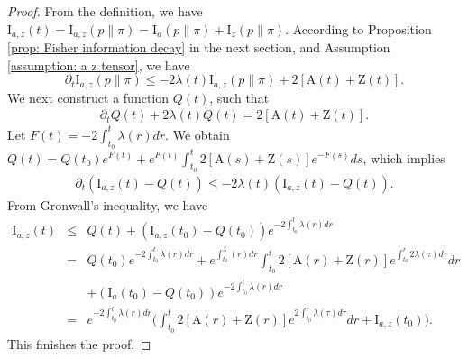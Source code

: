 \documentclass[11pt,reqno]{amsart}
\newcommand{\beaa}{\begin{eqnarray*}}
\newcommand{\eeaa}{\end{eqnarray*}}
\def\pa{\partial}
\def\qed{ \hfill \vrule width.25cm height.25cm depth0cm\smallskip}
\begin{document}
\begin{proof}
From the definition, we have $\mathrm I_{a,z}(t)=\mathrm I_{a,z}({p} \|\pi)=\mathrm I_{a}({p} \|\pi)+\mathrm I_{z}({p} \|\pi)$.	According to Proposition \ref{prop: Fisher information decay} in the next section, and Assumption \eqref{assumption: a z tensor}, we have 
\begin{equation*}
    \pa_t\mathrm I_{a,z}({p} \|\pi)\leq -2\lambda(t) \mathrm{I}_{a,z}({p} \|\pi)+2[\mathrm A(t)+\mathrm Z(t)]. 
\end{equation*}
We next construct a function $Q(t)$, such that 
\beaa 
\pa_t Q(t)+2\lambda(t)Q(t)=2[\mathrm A(t)+\mathrm Z(t)].
\eeaa 
Let $F(t)=-2\int_{t_0}^t \lambda(r) dr $. We obtain $Q(t)=Q(t_0) e^{F(t)}+e^{F(t)}\int_{t_0}^t 2[\mathrm A(s)+\mathrm Z(s)]e^{-F(s)}ds$, which implies 
\beaa 
\pa_t (\mathrm I_{a,z}(t)-Q(t))\le -2\lambda(t)(\mathrm I_{a,z}(t)-Q(t)). 
\eeaa 
From Gronwall's inequality, we have
\beaa %
\mathrm I_{a,z}(t)&\le& Q(t)+(\mathrm I_{a,z}(t_0)-Q(t_0))e^{-2\int_{t_0}^t\lambda(r)dr}\\
&= & Q(t_0)e^{-2\int_{t_0}^t \lambda(r)dr}+e^{\int_{t_0}^\lambda(r)dr}\int_{t_0}^t 2[\mathrm A(r)+\mathrm Z(r)]e^{\int_{t_0}^r2\lambda(\tau)d\tau} dr\\
& &+(\mathrm I_a(t_0)-Q(t_0))e^{-2\int_{t_0}^t\lambda(r)dr}\nonumber \\
&= & e^{-2\int_{t_0}^t \lambda(r)dr}\Big(\int_{t_0}^t 2[\mathrm A(r)+\mathrm Z(r)]e^{2\int_{t_0}^r\lambda(\tau)d\tau} dr+\mathrm I_{a,z}(t_0)\Big).\nonumber
\eeaa
This finishes the proof. \qed
\end{proof}
\end{document}
